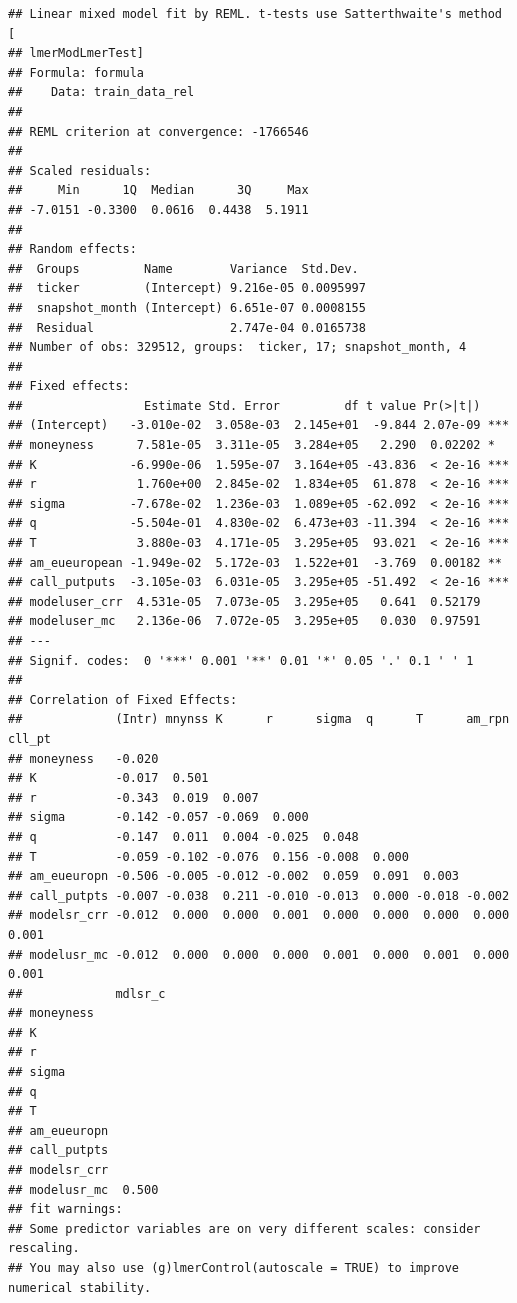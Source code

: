 \documentclass[
]{article}
\begin{document}
\begin{verbatim}
## Linear mixed model fit by REML. t-tests use Satterthwaite's method [
## lmerModLmerTest]
## Formula: formula
##    Data: train_data_rel
## 
## REML criterion at convergence: -1766546
## 
## Scaled residuals: 
##     Min      1Q  Median      3Q     Max 
## -7.0151 -0.3300  0.0616  0.4438  5.1911 
## 
## Random effects:
##  Groups         Name        Variance  Std.Dev. 
##  ticker         (Intercept) 9.216e-05 0.0095997
##  snapshot_month (Intercept) 6.651e-07 0.0008155
##  Residual                   2.747e-04 0.0165738
## Number of obs: 329512, groups:  ticker, 17; snapshot_month, 4
## 
## Fixed effects:
##                 Estimate Std. Error         df t value Pr(>|t|)    
## (Intercept)   -3.010e-02  3.058e-03  2.145e+01  -9.844 2.07e-09 ***
## moneyness      7.581e-05  3.311e-05  3.284e+05   2.290  0.02202 *  
## K             -6.990e-06  1.595e-07  3.164e+05 -43.836  < 2e-16 ***
## r              1.760e+00  2.845e-02  1.834e+05  61.878  < 2e-16 ***
## sigma         -7.678e-02  1.236e-03  1.089e+05 -62.092  < 2e-16 ***
## q             -5.504e-01  4.830e-02  6.473e+03 -11.394  < 2e-16 ***
## T              3.880e-03  4.171e-05  3.295e+05  93.021  < 2e-16 ***
## am_eueuropean -1.949e-02  5.172e-03  1.522e+01  -3.769  0.00182 ** 
## call_putputs  -3.105e-03  6.031e-05  3.295e+05 -51.492  < 2e-16 ***
## modeluser_crr  4.531e-05  7.073e-05  3.295e+05   0.641  0.52179    
## modeluser_mc   2.136e-06  7.072e-05  3.295e+05   0.030  0.97591    
## ---
## Signif. codes:  0 '***' 0.001 '**' 0.01 '*' 0.05 '.' 0.1 ' ' 1
## 
## Correlation of Fixed Effects:
##             (Intr) mnynss K      r      sigma  q      T      am_rpn cll_pt
## moneyness   -0.020                                                        
## K           -0.017  0.501                                                 
## r           -0.343  0.019  0.007                                          
## sigma       -0.142 -0.057 -0.069  0.000                                   
## q           -0.147  0.011  0.004 -0.025  0.048                            
## T           -0.059 -0.102 -0.076  0.156 -0.008  0.000                     
## am_eueuropn -0.506 -0.005 -0.012 -0.002  0.059  0.091  0.003              
## call_putpts -0.007 -0.038  0.211 -0.010 -0.013  0.000 -0.018 -0.002       
## modelsr_crr -0.012  0.000  0.000  0.001  0.000  0.000  0.000  0.000  0.001
## modelusr_mc -0.012  0.000  0.000  0.000  0.001  0.000  0.001  0.000  0.001
##             mdlsr_c
## moneyness          
## K                  
## r                  
## sigma              
## q                  
## T                  
## am_eueuropn        
## call_putpts        
## modelsr_crr        
## modelusr_mc  0.500 
## fit warnings:
## Some predictor variables are on very different scales: consider rescaling. 
## You may also use (g)lmerControl(autoscale = TRUE) to improve numerical stability.
\end{verbatim}
\end{document}
